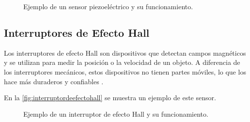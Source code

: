 \begin{figure}[h!]
		\centering
	\caption{Ejemplo de un sensor piezoeléctrico y su funcionamiento.}
	\label{fig:piezoelectricos}
\end{figure}




\subsection{Interruptores de Efecto Hall}
Los interruptores de efecto Hall son dispositivos que detectan campos magnéticos y se utilizan para medir la posición o la velocidad de un objeto. A diferencia de los interruptores mecánicos, estos dispositivos no tienen partes móviles, lo que los hace más duraderos y confiables \cite{EfectoHall}.

En la \autoref{fig:interruptordeefectohall} se muestra un ejemplo de este sensor.

\begin{figure}[h!]
	\centering
	\caption{Ejemplo de un interruptor de efecto Hall y su funcionamiento.}
	\label{fig:interruptordeefectohall}
\end{figure}